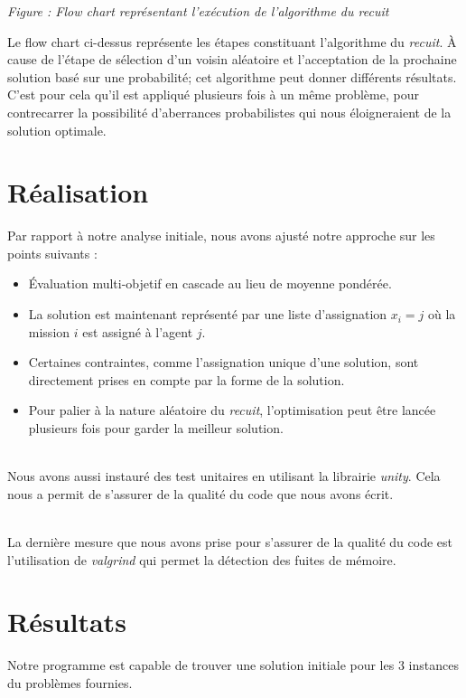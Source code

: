 \documentclass[11pt]{article}
\newcommand{\myjump}[1][0]{\mbox{}\\[#1cm]}
\newcounter{nbFigures}
\newcommand{\myfigure}[2]{
\begin{center}
    \fbox{
    \texttt{[image: \#1]}}\newline
    \emph{Figure \arabic{nbFigures} : #2}
    \stepcounter{nbFigures}
\end{center}
}
\begin{document}
\myfigure{Images/Flowchart_recuit.pdf}{Flow chart représentant l'exécution de l'algorithme du recuit}

Le flow chart ci-dessus représente les étapes constituant l'algorithme du \emph{recuit}. À cause de l'étape de sélection d'un voisin aléatoire et l'acceptation de la prochaine solution basé sur une probabilité; cet algorithme peut donner différents résultats. C'est pour cela qu'il est appliqué plusieurs fois à un même problème, pour contrecarrer la possibilité d'aberrances probabilistes qui nous éloigneraient de la solution optimale.






\newpage
\section{Réalisation}

\noindent Par rapport à notre analyse initiale, nous avons ajusté notre approche sur les points suivants :
\begin{itemize}
    \item Évaluation multi-objetif en cascade au lieu de moyenne pondérée.
    \item La solution est maintenant représenté par une liste d'assignation $x_i = j$ où la mission $i$ est assigné à l'agent $j$.
    \item Certaines contraintes, comme l'assignation unique d'une solution, sont directement prises en compte par la forme de la solution.
    \item Pour palier à la nature aléatoire du \emph{recuit}, l'optimisation peut être lancée plusieurs fois pour garder la meilleur solution.
\end{itemize}


\myjump
Nous avons aussi instauré des test unitaires en utilisant la librairie \emph{unity}. Cela nous a permit de s'assurer de la qualité du code que nous avons écrit.

\myjump
La dernière mesure que nous avons prise pour s'assurer de la qualité du code est l'utilisation de \emph{valgrind} qui permet la détection des fuites de mémoire.



\section{Résultats}

Notre programme est capable de trouver une solution initiale pour les 3 instances du problèmes fournies.
\end{document}
